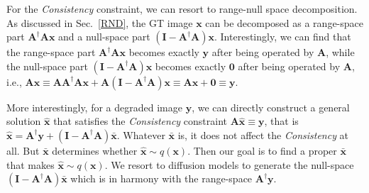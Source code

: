 \documentclass{article} \usepackage{iclr2023_conference,times}
\begin{document}
For the \textit{Consistency} constraint, we can resort to range-null space decomposition. As discussed in Sec.~\ref{RND}, the GT image $\mathbf{x}$ can be decomposed as a range-space part $\mathbf{A^{\dagger}}\mathbf{A}\mathbf{x}$ and a null-space part $(\mathbf{I} - \mathbf{A^{\dagger}}\mathbf{A})\mathbf{x}$. Interestingly, we can find that the range-space part $\mathbf{A^{\dagger}}\mathbf{A}\mathbf{x}$ becomes exactly $\mathbf{y}$ after being operated by $\mathbf{A}$, while the null-space part $(\mathbf{I} - \mathbf{A^{\dagger}}\mathbf{A})\mathbf{x}$ becomes exactly $\mathbf{0}$ after being operated by $\mathbf{A}$, i.e., $\mathbf{A}\mathbf{x}\equiv\mathbf{A}\mathbf{A^{\dagger}}\mathbf{A}\mathbf{x} + \mathbf{A}(\mathbf{I} - \mathbf{A^{\dagger}}\mathbf{A})\mathbf{x}
    \equiv \mathbf{A}\mathbf{x} + \mathbf{0}   \equiv \mathbf{y}$.

More interestingly, for a degraded image $\mathbf{y}$, we can directly construct a general solution $\hat{\mathbf{x}}$ that satisfies the \textit{Consistency} constraint $\mathbf{A}\hat{\mathbf{x}} \equiv \mathbf{y}$, that is $\hat{\mathbf{x}}=\mathbf{A^{\dagger}}\mathbf{y} + (\mathbf{I} - \mathbf{A^{\dagger}}\mathbf{A})\bar{\mathbf{x}}$. Whatever $\bar{\mathbf{x}}$ is, it does not affect the \textit{Consistency} at all. But $\bar{\mathbf{x}}$ determines whether $\hat{\mathbf{x}} \sim q(\mathbf{x})$. Then our goal is to find a proper $\bar{\mathbf{x}}$ that makes $\hat{\mathbf{x}} \sim q(\mathbf{x})$. We resort to diffusion models to generate the null-space $(\mathbf{I} - \mathbf{A^{\dagger}}\mathbf{A})\bar{\mathbf{x}}$ 
which is in harmony with the range-space $\mathbf{A^{\dagger}}\mathbf{y}$.
\end{document}
